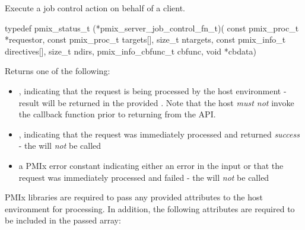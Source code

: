 \summary

Execute a job control action on behalf of a client.

\format

\cspecificstart
\begin{codepar}
typedef pmix_status_t (*pmix_server_job_control_fn_t)(
                             const pmix_proc_t *requestor,
                             const pmix_proc_t targets[], size_t ntargets,
                             const pmix_info_t directives[], size_t ndirs,
                             pmix_info_cbfunc_t cbfunc, void *cbdata)
\end{codepar}
\cspecificend

\begin{arglist}
\end{arglist}

Returns one of the following:

\begin{itemize}
    \item {}, indicating that the request is being processed by the host environment - result will be returned in the provided . Note that the host \emph{must not} invoke the callback function prior to returning from the \ac{API}.
    \item {}, indicating that the request was immediately processed and returned \textit{success} - the  will \textit{not} be called
    \item a PMIx error constant indicating either an error in the input or that the request was immediately processed and failed - the  will \textit{not} be called
\end{itemize}

\reqattrstart
\ac{PMIx} libraries are required to pass any provided attributes to the host environment for processing. In addition, the following attributes are required to be included in the passed  array:

